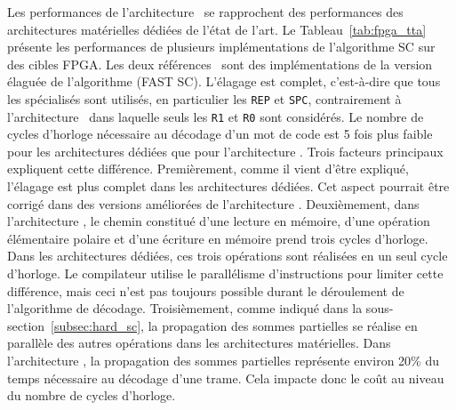 Les performances de l'architecture \TTSC~se rapprochent des performances des architectures matérielles dédiées de l'état de l'art. Le Tableau~\ref{tab:fpga_tta} présente les performances de plusieurs implémentations de l'algorithme SC sur des cibles FPGA. Les deux références~\cite{sarkis_fast_2014,giard_638_2015} sont des implémentations de la version élaguée de l'algorithme (FAST SC). L'élagage est complet, c'est-à-dire que tous les \noeuds spécialisés sont utilisés, en particulier les \noeuds \texttt{REP} et \texttt{SPC}, contrairement à l'architecture \TTSC~dans laquelle seuls les \noeuds \texttt{R1} et \texttt{R0} sont considérés. Le nombre de cycles d'horloge nécessaire au décodage d'un mot de code est 5 fois plus faible pour les architectures dédiées que pour l'architecture \TTSC. Trois facteurs principaux expliquent cette différence. Premièrement, comme il vient d'être expliqué, l'élagage est plus complet dans les architectures dédiées. Cet aspect pourrait être corrigé dans des versions améliorées de l'architecture \TTSC. Deuxièmement, dans l'architecture \TTSC, le chemin constitué d'une lecture en mémoire, d'une opération élémentaire polaire et d'une écriture en mémoire prend trois cycles d'horloge. Dans les architectures dédiées, ces trois opérations sont réalisées en un seul cycle d'horloge. Le compilateur utilise le parallélisme d'instructions pour limiter cette différence, mais ceci n'est pas toujours possible durant le déroulement de l'algorithme de décodage. Troisièmement, comme indiqué dans la sous-section~\ref{subsec:hard_sc}, la propagation des sommes partielles se réalise en parallèle des autres opérations dans les architectures matérielles. Dans l'architecture \TTSC, la propagation des sommes partielles représente environ 20\% du temps nécessaire au décodage d'une trame. Cela impacte donc le coût au niveau du nombre de cycles d'horloge.



